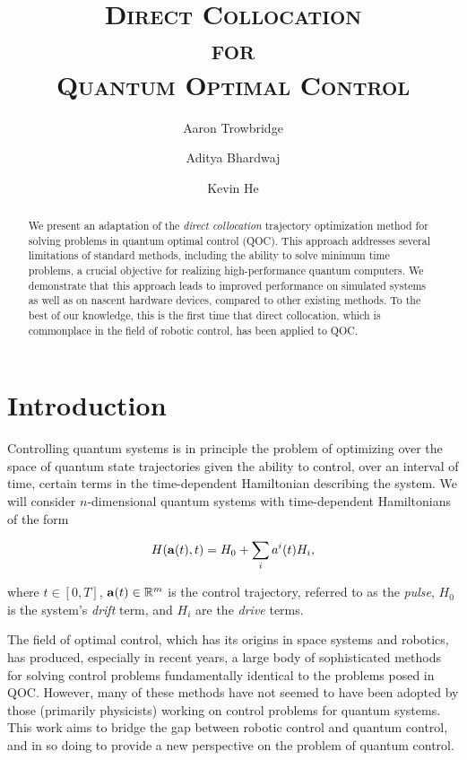 \documentclass{article}
\title{\LARGE \textsc{
  Direct Collocation \\ for \\ Quantum Optimal Control 
}}
\author[1]{Aaron Trowbridge}
\author[2]{Aditya Bhardwaj}
\author[2]{Kevin He}
\affil[1]{Robotics Exploration Lab, Carnegie Mellon University}
\affil[2]{Schuster Lab, Stanford University}
\date{}
\begin{document}
\maketitle


\begin{abstract}
  We present an adaptation of the \textit{direct collocation} trajectory optimization method for solving problems in quantum optimal control (QOC).  This approach addresses several limitations of standard methods, including the ability to solve minimum time problems, a crucial objective for realizing high-performance quantum computers.  We demonstrate that this approach leads to improved performance on simulated systems as well as on nascent hardware devices, compared to other existing methods.  To the best of our knowledge, this is the first time that direct collocation, which is commonplace in the field of robotic control, has been applied to QOC. 
\end{abstract}


\tableofcontents

\newpage


\section{Introduction}
Controlling quantum systems is in principle the problem of optimizing over the space of quantum state trajectories given the ability to control, over an interval of time, certain terms in the time-dependent Hamiltonian describing the system. We will consider $n$-dimensional quantum systems with time-dependent Hamiltonians of the form

\begin{equation}
  H(\vb{a}(t), t) = H_0 + \sum_i a^i(t) H_i,
\end{equation}

\noindent
where $t \in [0, T]$, $\vb{a}(t) \in \mathbb{R}^m$ is the control trajectory, referred to as the \textit{pulse}, $H_0$ is the system's \textit{drift} term, and $H_i$ are the \textit{drive} terms.  

The field of optimal control, which has its origins in space systems and robotics, has produced, especially in recent years, a large body of sophisticated methods for solving control problems fundamentally identical to the problems posed in QOC.  However, many of these methods have not seemed to have been adopted by those (primarily physicists) working on control problems for quantum systems. This work aims to bridge the gap between robotic control and quantum control, and in so doing to provide a new perspective on the problem of quantum control. 
\end{document}
